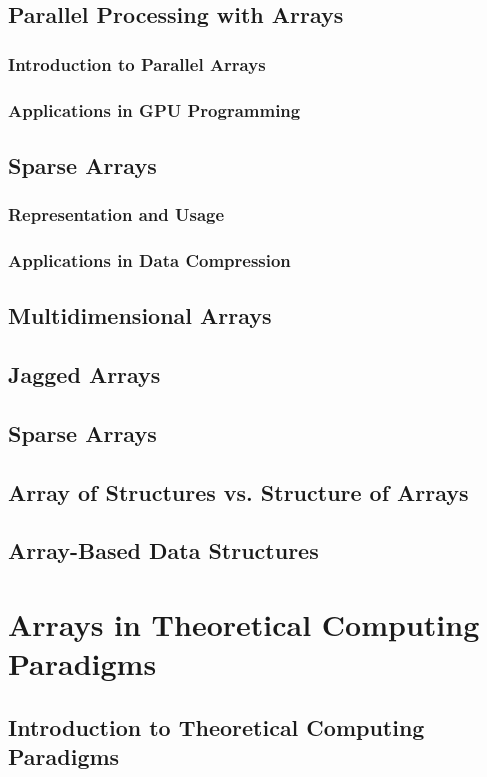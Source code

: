 \documentclass[12pt, oneside]{book}
\begin{document}
	\section{Parallel Processing with Arrays}
	\subsection{Introduction to Parallel Arrays}
	\subsection{Applications in GPU Programming}
	
	\section{Sparse Arrays}
	\subsection{Representation and Usage}
	\subsection{Applications in Data Compression}
	\section{Multidimensional Arrays}
	\section{Jagged Arrays}
	\section{Sparse Arrays}
	\section{Array of Structures vs. Structure of Arrays}
	\section{Array-Based Data Structures}
	
	\chapter{Arrays in Theoretical Computing Paradigms}
	
	\section{Introduction to Theoretical Computing Paradigms}
\end{document}
